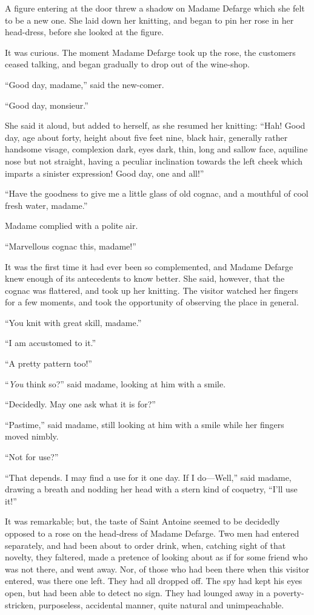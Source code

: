 A figure entering at the door threw a shadow on Madame Defarge which
she felt to be a new one.  She laid down her knitting, and began to
pin her rose in her head-dress, before she looked at the figure.

It was curious.  The moment Madame Defarge took up the rose, the
customers ceased talking, and began gradually to drop out of the
wine-shop.

``Good day, madame,'' said the new-comer.

``Good day, monsieur.''

She said it aloud, but added to herself, as she resumed her knitting:
``Hah!  Good day, age about forty, height about five feet nine, black
hair, generally rather handsome visage, complexion dark, eyes dark,
thin, long and sallow face, aquiline nose but not straight, having a
peculiar inclination towards the left cheek which imparts a sinister
expression!  Good day, one and all!''

``Have the goodness to give me a little glass of old cognac, and a
mouthful of cool fresh water, madame.''

Madame complied with a polite air.

``Marvellous cognac this, madame!''

It was the first time it had ever been so complemented, and Madame
Defarge knew enough of its antecedents to know better.  She said,
however, that the cognac was flattered, and took up her knitting.
The visitor watched her fingers for a few moments, and took the
opportunity of observing the place in general.

``You knit with great skill, madame.''

``I am accustomed to it.''

``A pretty pattern too!''

``\emph{You} think so?'' said madame, looking at him with a smile.

``Decidedly.  May one ask what it is for?''

``Pastime,'' said madame, still looking at him with a smile while her
fingers moved nimbly.

``Not for use?''

``That depends.  I may find a use for it one day.  If I do---Well,''
said madame, drawing a breath and nodding her head with a stern kind
of coquetry, ``I'll use it!''

It was remarkable; but, the taste of Saint Antoine seemed to be
decidedly opposed to a rose on the head-dress of Madame Defarge.
Two men had entered separately, and had been about to order drink, when,
catching sight of that novelty, they faltered, made a pretence of
looking about as if for some friend who was not there, and went away.
Nor, of those who had been there when this visitor entered, was there one
left.  They had all dropped off.  The spy had kept his eyes open, but had
been able to detect no sign.  They had lounged away in a poverty-stricken,
purposeless, accidental manner, quite natural and unimpeachable.

